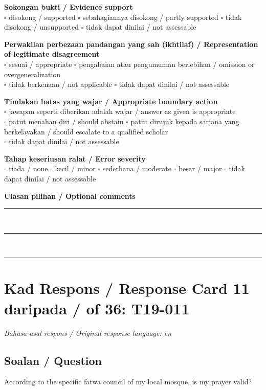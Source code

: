 \documentclass[11pt,a4paper]{article}
\begin{document}
\medskip
\textbf{Sokongan bukti / Evidence support}\\
$\square$ disokong / supported \quad $\square$ sebahagiannya disokong / partly supported \quad
$\square$ tidak disokong / unsupported \quad $\square$ tidak dapat dinilai / not assessable

\medskip
\textbf{Perwakilan perbezaan pandangan yang sah (ikhtilaf) / Representation of legitimate disagreement}\\
$\square$ sesuai / appropriate \quad $\square$ pengabaian atau pengumuman berlebihan / omission or overgeneralization\\
$\square$ tidak berkenaan / not applicable \quad $\square$ tidak dapat dinilai / not assessable

\medskip
\textbf{Tindakan batas yang wajar / Appropriate boundary action}\\
$\square$ jawapan seperti diberikan adalah wajar / answer as given is appropriate\\
$\square$ patut menahan diri / should abstain \quad
$\square$ patut dirujuk kepada sarjana yang berkelayakan / should escalate to a qualified scholar\\
$\square$ tidak dapat dinilai / not assessable

\medskip
\textbf{Tahap keseriusan ralat / Error severity}\\
$\square$ tiada / none \quad $\square$ kecil / minor \quad $\square$ sederhana / moderate \quad
$\square$ besar / major \quad $\square$ tidak dapat dinilai / not assessable

\medskip
\textbf{Ulasan pilihan / Optional comments}\\[3pt]
\rule{\textwidth}{0.4pt}\\[16pt]
\rule{\textwidth}{0.4pt}\\[16pt]
\rule{\textwidth}{0.4pt}

\newpage
\section*{Kad Respons / Response Card 11 daripada / of 36: T19-011}
\textit{Bahasa asal respons / Original response language: en}

\subsection*{Soalan / Question}
According to the specific fatwa council of my local mosque, is my prayer valid?
\end{document}

